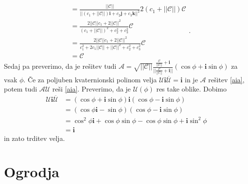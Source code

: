 \documentclass[mat1]{fmfdelo}
\newcommand{\ii}{\boldsymbol i}
\newcommand{\jj}{\boldsymbol j}
\newcommand{\kk}{\boldsymbol k}
\newcommand{\A}{\mathcal A}
\newcommand{\CC}{\mathcal C}
\begin{document}
\begin{dokaz}
\begin{equation*}
\begin{split}
		&=\frac{||\CC||}{||(c_1 + ||\CC||)\ii+c_2\jj+c_3\kk||^2}2(c_1+||\CC||)\CC \\
		&=\frac{2||\CC||c_1+2||\CC||^2}{(c_1+||\CC||)^2+c_2^2+c_3^2}\CC \\
		&=\frac{2||\CC||c_1+2||\CC||^2}{c_1^2+2c_1||\CC|| + ||\CC||^2+c_2^2+c_3^2}\CC \\
		&=\CC
				\end{split}.
	\end{equation*}
	Sedaj pa preverimo, da je rešitev tudi $\A = \sqrt{||\CC||} \frac{\frac{\CC}{||\CC||} + \ii}{||\frac{\CC}{||\CC||} + \ii||}\left(\cos \phi + \ii \sin \phi \right)$ za vsak $\phi$.	Če za poljuben kvaternionski polinom velja $\mathcal{U} \ii \overline{\mathcal{U}} = \ii$ in je $\A$ rešitev
	\ref{aia}, potem tudi $\A \mathcal{U}$ reši \ref{aia}. Preverimo, da je $\mathcal{U}(\phi)$ res take oblike. Dobimo
	\begin{equation*}
	\begin{split}
		\mathcal{U}\ii\overline{\mathcal{U}} &= (\cos\phi + \ii\sin\phi) \ii (\cos\phi-\ii\sin\phi) \\
		&=(\cos\phi \ii - \sin\phi)(\cos\phi-\ii\sin\phi) \\
		&= \cos^2\phi \ii +\cos\phi\sin\phi - \cos\phi\sin\phi +\ii\sin^2\phi\\
		&= \ii
	\end{split}
	\end{equation*}
	in zato trditev velja.
\end{dokaz}
\section{Ogrodja}
\end{document}
